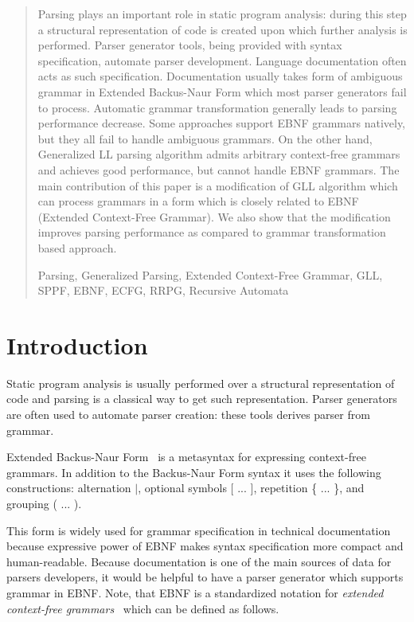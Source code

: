 \documentclass[runningheads,a4paper]{llncs}
\newcommand{\keywords}[1]{\par\addvspace\baselineskip
\noindent\keywordname\enspace\ignorespaces#1}
\begin{document}
\begin{abstract}
Parsing plays an important role in static program analysis: during this step a structural representation of code is created upon which further analysis is performed. 
Parser generator tools, being provided with syntax specification, automate parser development. 
Language documentation often acts as such specification. 
Documentation usually takes form of ambiguous grammar in Extended Backus-Naur Form which most parser generators fail to process. 
Automatic grammar transformation generally leads to parsing performance decrease. 
Some approaches support EBNF grammars natively, but they all fail to handle ambiguous grammars. 
On the other hand, Generalized LL parsing algorithm admits arbitrary context-free grammars and achieves good performance, but cannot handle EBNF grammars. 
The main contribution of this paper is a modification of GLL algorithm which can process grammars in a form which is closely related to EBNF (Extended Context-Free Grammar). 
We also show that the modification improves parsing performance as compared to grammar transformation based approach. 

\keywords{Parsing, Generalized Parsing, Extended Context-Free Grammar, GLL, SPPF, EBNF, ECFG, RRPG, Recursive Automata}
\end{abstract}


\section{Introduction}%

Static program analysis is usually performed over a structural representation of code and parsing is a classical way to get such representation.
Parser generators are often used to automate parser creation: these tools derives parser from grammar.

Extended Backus-Naur Form~\cite{EBNFISO} is a metasyntax for expressing context-free grammars. 
In addition to the Backus-Naur Form syntax it uses the following constructions: alternation $\mid$, optional symbols [ ... ], repetition \{ ... \}, and grouping ( ... ).

This form is widely used for grammar specification in technical documentation because expressive power of EBNF makes syntax specification more compact and human-readable. 
Because documentation is one of the main sources of data for parsers developers, it would be helpful to have a parser generator which supports grammar in EBNF.
Note, that EBNF is a standardized notation for \textit{extended context-free grammars}~\cite{ECFG} which can be defined as follows.
\end{document}
